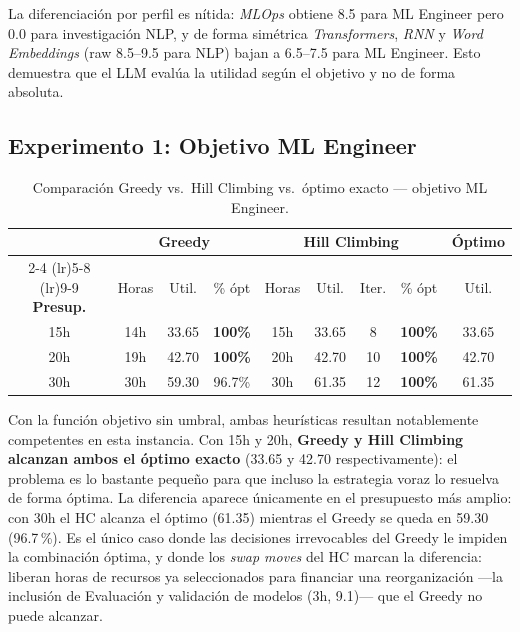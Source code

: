 \documentclass[11pt, a4paper]{article}
\begin{document}
La diferenciación por perfil es nítida: \emph{MLOps} obtiene 8.5 para ML Engineer pero 0.0 para investigación NLP, y de forma simétrica \emph{Transformers}, \emph{RNN} y \emph{Word Embeddings} (raw 8.5–9.5 para NLP) bajan a 6.5–7.5 para ML Engineer. Esto demuestra que el LLM evalúa la utilidad según el objetivo y no de forma absoluta.

\subsection{Experimento 1: Objetivo ML Engineer}

\begin{table}[H]
\centering
\small
\caption{Comparación Greedy vs.\ Hill Climbing vs.\ óptimo exacto — objetivo ML Engineer.}
\begin{tabular}{c ccc cccc c}
\toprule
& \multicolumn{3}{c}{\textbf{Greedy}} & \multicolumn{4}{c}{\textbf{Hill Climbing}} & \textbf{Óptimo} \\
\cmidrule(lr){2-4} \cmidrule(lr){5-8} \cmidrule(lr){9-9}
\textbf{Presup.} & Horas & Util. & \% ópt & Horas & Util. & Iter. & \% ópt & Util. \\
\midrule
15h & 14h & 33.65 & \textbf{\color{alpsgreen}100\%} & 15h & 33.65 & 8 & \textbf{\color{alpsgreen}100\%} & 33.65 \\
20h & 19h & 42.70 & \textbf{\color{alpsgreen}100\%} & 20h & 42.70 & 10 & \textbf{\color{alpsgreen}100\%} & 42.70 \\
30h & 30h & 59.30 & 96.7\% & 30h & 61.35 & 12 & \textbf{\color{alpsgreen}100\%} & 61.35 \\
\bottomrule
\end{tabular}
\end{table}

Con la función objetivo sin umbral, ambas heurísticas resultan notablemente
competentes en esta instancia. Con 15h y 20h, \textbf{Greedy y Hill Climbing
alcanzan ambos el óptimo exacto} (33.65 y 42.70 respectivamente): el problema
es lo bastante pequeño para que incluso la estrategia voraz lo resuelva de
forma óptima. La diferencia aparece únicamente en el presupuesto más amplio:
con 30h el HC alcanza el óptimo (61.35) mientras el Greedy se queda en 59.30
(96.7\,\%). Es el único caso donde las decisiones irrevocables del Greedy le
impiden la combinación óptima, y donde los \emph{swap moves} del HC marcan la
diferencia: liberan horas de recursos ya seleccionados para financiar una
reorganización —la inclusión de Evaluación y validación de modelos (3h, 9.1)—
que el Greedy no puede alcanzar.
\end{document}
